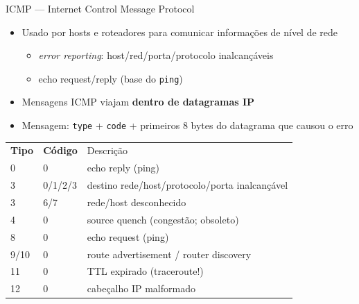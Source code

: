 \documentclass[aspectratio=169,11pt]{beamer}
\begin{document}
\begin{frame}{ICMP --- Internet Control Message Protocol}
  \begin{itemize}
    \item Usado por hosts e roteadores para comunicar informações de nível de rede
      \begin{itemize}
        \item \emph{error reporting}: host/red/porta/protocolo inalcançáveis
        \item echo request/reply (base do \texttt{ping})
      \end{itemize}
    \item Mensagens ICMP viajam \textbf{dentro de datagramas IP}
    \item Mensagem: \texttt{type} + \texttt{code} + primeiros 8 bytes do datagrama que causou o erro
  \end{itemize}
  \vspace{0.1cm}
  \begin{center}
    \scriptsize
    \begin{tabular}{@{}lll@{}}
      \textbf{Tipo} & \textbf{Código} & Descrição\\
      0 & 0 & echo reply (ping)\\
      3 & 0/1/2/3 & destino rede/host/protocolo/porta inalcançável\\
      3 & 6/7 & rede/host desconhecido\\
      4 & 0 & source quench (congestão; \alert{obsoleto})\\
      8 & 0 & echo request (ping)\\
      9/10 & 0 & route advertisement / router discovery\\
      11 & 0 & TTL expirado (\alert{traceroute!})\\
      12 & 0 & cabeçalho IP malformado\\
    \end{tabular}
  \end{center}
\end{frame}
\end{document}

